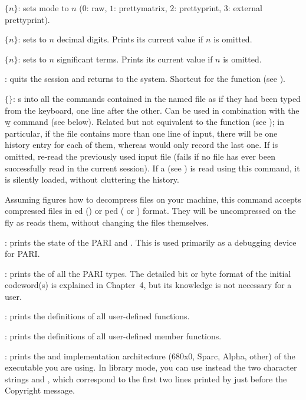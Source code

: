  $\{n\}$: sets  mode to $n$ ($0$: raw, $1$:
prettymatrix, $2$: prettyprint, $3$: external prettyprint).

 $\{n\}$: sets  to $n$ decimal
digits. Prints its current value if $n$ is omitted.

 $\{n\}$: sets  to $n$ significant terms.
Prints its current value if $n$ is omitted.

: quits the  session and returns to the system.
Shortcut for the function  (see ).

 $\{$$\}$: s into  all the
commands contained in the named file as if they had been typed from the
keyboard, one line after the other. Can be used in combination with the \b{w}
command (see below). Related but not equivalent to the function 
(see ); in particular, if the file contains more than one
line of input, there will be one history entry for each of them, whereas
 would only record the last one. If  is omitted,
re-read the previously used input file (fails if no file has ever been
successfully read in the current session). If a  
(see ) is read using this command, it is silently loaded,
without cluttering the history.

Assuming  figures how to decompress files on your machine, this
command accepts compressed files in ed () or
ped ( or ) format. They will be uncompressed on
the fly as  reads them, without changing the files themselves.

: prints the state of the PARI  and .
This is used primarily as a debugging device for PARI.

: prints the  of all the PARI
types. The detailed bit or byte format of the initial codeword(s) is
explained in Chapter~4, but its knowledge is not necessary for a  user.

: prints the definitions of all user-defined functions.

: prints the definitions of all user-defined member functions.

: prints the  and implementation architecture
(680x0, Sparc, Alpha, other) of the  executable you are using. In library
mode, you can use instead the two character strings  and
, which correspond to the first two lines printed by  just
before the Copyright message.

